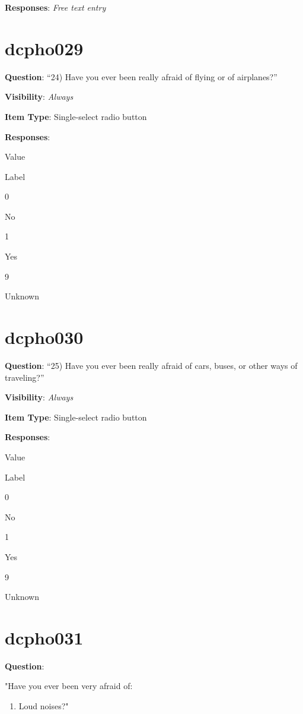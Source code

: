 \documentclass[]{book}
\providecommand{\tightlist}{%
  \setlength{\itemsep}{0pt}\setlength{\parskip}{0pt}}
\begin{document}
\textbf{Responses}: \emph{Free text entry}

\hypertarget{dcpho029}{%
\section{dcpho029}\label{dcpho029}}

\textbf{Question}: ``24) Have you ever been really afraid of flying or of airplanes?''

\textbf{Visibility}: \emph{Always}

\textbf{Item Type}: Single-select radio button

\textbf{Responses}:

Value

Label

0

No

1

Yes

9

Unknown

\hypertarget{dcpho030}{%
\section{dcpho030}\label{dcpho030}}

\textbf{Question}: ``25) Have you ever been really afraid of cars, buses, or other ways of traveling?''

\textbf{Visibility}: \emph{Always}

\textbf{Item Type}: Single-select radio button

\textbf{Responses}:

Value

Label

0

No

1

Yes

9

Unknown

\hypertarget{dcpho031}{%
\section{dcpho031}\label{dcpho031}}

\textbf{Question}:

"Have you ever been very afraid of:

\begin{enumerate}
\def\labelenumi{\arabic{enumi})}
\setcounter{enumi}{25}
\tightlist
\item
  Loud noises?"
\end{enumerate}
\end{document}
